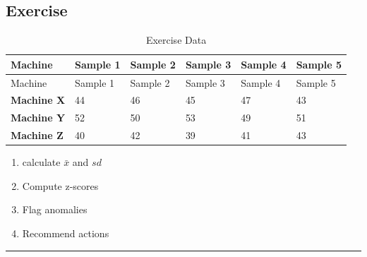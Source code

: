\documentclass[
  a4paper,
]{scrbook}
\providecommand{\tightlist}{%
  \setlength{\itemsep}{0pt}\setlength{\parskip}{0pt}}\usepackage{longtable,booktabs,array}
\begin{document}
\subsection{Exercise}\label{exercise-1}

\begin{longtable}[]{@{}llllll@{}}
\caption{Exercise Data}\tabularnewline
\toprule\noalign{}
Machine & Sample 1 & Sample 2 & Sample 3 & Sample 4 & Sample 5 \\
\midrule\noalign{}
\endfirsthead
\toprule\noalign{}
Machine & Sample 1 & Sample 2 & Sample 3 & Sample 4 & Sample 5 \\
\midrule\noalign{}
\endhead
\bottomrule\noalign{}
\endlastfoot
\textbf{Machine X} & 44 & 46 & 45 & 47 & 43 \\
\textbf{Machine Y} & 52 & 50 & 53 & 49 & 51 \\
\textbf{Machine Z} & 40 & 42 & 39 & 41 & 43 \\
\end{longtable}

\begin{table}

\caption{\label{tbl-exercise-z}Exercise Data}


\end{table}%

\begin{enumerate}
\def\labelenumi{\arabic{enumi}.}
\tightlist
\item
  calculate \(\bar{x}\) and \(sd\)
\item
  Compute z-scores
\item
  Flag anomalies
\item
  Recommend actions
\end{enumerate}

\begin{center}\rule{0.5\linewidth}{0.5pt}\end{center}
\end{document}
